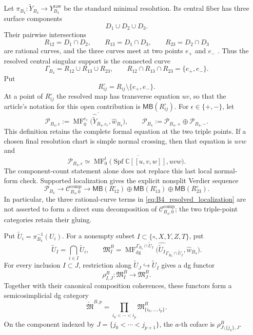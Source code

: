 \documentclass[11pt]{amsart}
\theoremstyle{definition}
\theoremstyle{remark}
\DeclareMathOperator{\MF}{MF}
\newcommand{\MBcat}[1]{\mathsf{MB}(#1)}
\newcommand{\CcompB}{\mathcal C^{\mathrm{comp}}_{B_4,0}}
\begin{document}
Let $\pi_{B_4}:\widetilde Y_{B_4}\to Y^{\mathrm{raw}}_{B_4}$ be the
standard minimal resolution.  Its central fiber has three surface components
\[
D_1\cup D_2\cup D_3.
\]
Their pairwise intersections
\[
R_{12}=D_1\cap D_2,
\qquad
R_{13}=D_1\cap D_3,
\qquad
R_{23}=D_2\cap D_3
\]
are rational curves, and the three curves meet at two points
$e_+$ and $e_-$ \cite{PrzyjalkowskiHodge}.  Thus the resolved central
singular support is the connected curve
\[
\Gamma_{B_4}=R_{12}\cup R_{13}\cup R_{23},
\qquad
R_{12}\cap R_{13}\cap R_{23}=\{e_+,e_-\}.
\]
Put
\[
R_{ij}^{\circ}=R_{ij}\setminus\{e_+,e_-\}.
\]
At a point of $R_{ij}^{\circ}$ the resolved map has transverse equation
$uv$, so that the article's notation for this open contribution is
$\MBcat{R_{ij}^{\circ}}$.  For $\epsilon\in\{+,-\}$, let
\[
\mathcal P_{B_4,\epsilon}
:=
\overline{\MF^{e_\epsilon}_0
\bigl(\widehat{\widetilde Y}_{B_4,e_\epsilon},
\widehat w_{B_4}\bigr)},
\qquad
\mathcal P_{B_4}:=
\mathcal P_{B_4,+}\oplus\mathcal P_{B_4,-}.
\]
This definition retains the complete formal equation at the two triple
points.  If a chosen final resolution chart is simple normal crossing, then
that equation is $uvw$ and
\[
\mathcal P_{B_4,\epsilon}
\simeq
\overline{\MF^t_0
\bigl(\operatorname{Spf}\mathbb C[[u,v,w]],uvw\bigr)}.
\]
The component-count statement alone does not replace this last local
normal-form check.
Supported localization gives the explicit nonsplit Verdier sequence
\begin{equation}
\label{eq:B4_resolved_localization}
\mathcal P_{B_4}
\longrightarrow
\CcompB
\longrightarrow
\MBcat{R_{12}^{\circ}}
\oplus\MBcat{R_{13}^{\circ}}
\oplus\MBcat{R_{23}^{\circ}}.
\end{equation}
In particular, the three rational-curve terms in
\eqref{eq:B4_resolved_localization} are not asserted to form a direct sum
decomposition of $\CcompB$; the two triple-point categories retain their
gluing.

Put $\widetilde U_i=\pi_{B_4}^{-1}(U_i)$.  For a nonempty
subset $I\subset\{\circ,X,Y,Z,T\}$, put
\[
\widetilde U_I=\bigcap_{i\in I}\widetilde U_i,
\qquad
\mathfrak M^B_I=
\MF^{\Gamma_{B_4}\cap\widetilde U_I}_{\mathrm{dg}}
\bigl(\widehat{\widetilde U_I}_{\Gamma_{B_4}\cap\widetilde U_I},
\widehat w_{B_4}\bigr).
\]
For every inclusion $I\subset J$, restriction along
$\widetilde U_J\hookrightarrow\widetilde U_I$ gives a dg functor
\begin{equation}
\label{eq:B4_cech_restriction}
\rho^B_{I,J}:\mathfrak M^B_I\longrightarrow\mathfrak M^B_J.
\end{equation}
Together with their canonical composition coherences, these functors form a
semicosimplicial dg category
\[
\check{\mathfrak M}^{B,p}
=
\prod_{i_0<\cdots<i_p}
\mathfrak M^B_{\{i_0,\ldots,i_p\}}.
\]
On the component indexed by $J=\{j_0<\cdots<j_{p+1}\}$, the $a$-th coface
is $\rho^B_{J\setminus\{j_a\},J}$.
\end{document}
